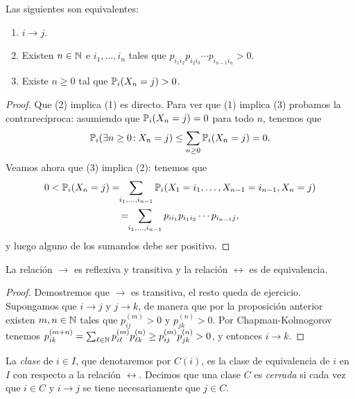 \begin{prop}
Las siguientes son equivalentes:
\begin{enumerate}[label=\uptext{(\arabic*)}]
\item $i\to j$.
\item Existen $n\in\mathbb{N}$ e $i_1,\dotsc,i_n$ tales que $p_{i_1i_2}p_{i_2i_3}\dotsm p_{i_{n-1}i_n}>0$.
\item Existe $n\geq0$ tal que $\mathbb{P}_i(X_n=j)>0$.
\end{enumerate}
\end{prop}

\begin{proof}

Que (2) implica (1) es directo.
Para ver que (1) implica (3) probamos la contrarecíproca: asumiendo que $\mathbb{P}_i(X_n=j)=0$ para todo $n$, tenemos que 
\[\mathbb{P}_i(\exists n\geq0\!:X_n=j)\leq\sum_{n\geq0}\mathbb{P}_i(X_n=j)=0.\]
Veamos ahora que (3) implica (2): tenemos que
\begin{multline*}
0<\mathbb{P}_i(X_n=j)=\!\!\sum_{i_1,\dotsc,i_{n-1}}\mathbb{P}_i(X_1=i_1,\dotsc,X_{n-1}=i_{n-1},X_n=j)\\
=\!\!\sum_{i_1,\dotsc,i_{n-1}}p_{ii_1}p_{i_1i_2}\dotsm p_{i_{n-1}j},
\end{multline*}
y luego alguno de los sumandos debe ser positivo.
\end{proof}

\begin{prop}
La relación $\to$ es reflexiva y transitiva y la relación $\leftrightarrow$ es de equivalencia.
\end{prop}

\begin{proof}
Demostremos que $\to$ es transitiva, el resto queda de ejercicio.
Supongamos que $i\to j$ y $j\to k$, de manera que por la proposición anterior existen $m,n\in\mathbb{N}$ tales que $p^{(m)}_{ij}>0$ y $p^{(n)}_{jk}>0$.
Por Chapman-Kolmogorov tenemos $p^{(m+n)}_{ik}=\sum_{\ell\in\mathbb{N}}p^{(m)}_{i\ell}p^{(n)}_{\ell k}\geq p^{(m)}_{ij}p^{(n)}_{jk}>0$, y entonces $i\to k$.
\end{proof}

\begin{defn}
La \emph{clase} de $i\in I$, que denotaremos por $C(i)$, es la clase de equivalencia de $i$ en $I$ con respecto a la relación $\leftrightarrow$.
Decimos que una clase $C$ es \emph{cerrada} si cada vez que $i\in C$ y $i\to j$ se tiene necesariamente que $j\in C$.
\end{defn}

